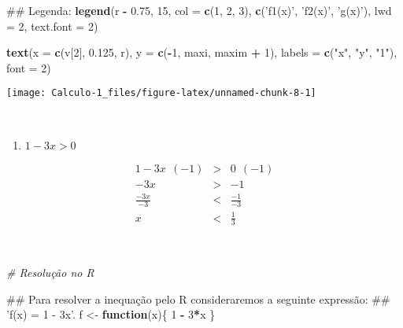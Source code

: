 \documentclass[]{book}
\newenvironment{Shaded}{\begin{snugshade}}{\end{snugshade}}
\newcommand{\KeywordTok}[1]{\textcolor[rgb]{0.13,0.29,0.53}{\textbf{#1}}}
\newcommand{\DataTypeTok}[1]{\textcolor[rgb]{0.13,0.29,0.53}{#1}}
\newcommand{\DecValTok}[1]{\textcolor[rgb]{0.00,0.00,0.81}{#1}}
\newcommand{\FloatTok}[1]{\textcolor[rgb]{0.00,0.00,0.81}{#1}}
\newcommand{\StringTok}[1]{\textcolor[rgb]{0.31,0.60,0.02}{#1}}
\newcommand{\CommentTok}[1]{\textcolor[rgb]{0.56,0.35,0.01}{\textit{#1}}}
\newcommand{\ControlFlowTok}[1]{\textcolor[rgb]{0.13,0.29,0.53}{\textbf{#1}}}
\newcommand{\OperatorTok}[1]{\textcolor[rgb]{0.81,0.36,0.00}{\textbf{#1}}}
\newcommand{\NormalTok}[1]{#1}
\providecommand{\tightlist}{%
  \setlength{\itemsep}{0pt}\setlength{\parskip}{0pt}}
\begin{document}
\begin{enumerate}
\begin{Shaded}
\begin{Highlighting}[]
\NormalTok{##  Legenda:}
\KeywordTok{legend}\NormalTok{(r }\OperatorTok{-}\StringTok{ }\FloatTok{0.75}\NormalTok{, }\DecValTok{15}\NormalTok{, }\DataTypeTok{col =} \KeywordTok{c}\NormalTok{(}\DecValTok{1}\NormalTok{, }\DecValTok{2}\NormalTok{, }\DecValTok{3}\NormalTok{), }\KeywordTok{c}\NormalTok{(}\StringTok{'f1(x)'}\NormalTok{, }\StringTok{'f2(x)'}\NormalTok{, }\StringTok{'g(x)'}\NormalTok{),}
   \DataTypeTok{lwd =} \DecValTok{2}\NormalTok{, }\DataTypeTok{text.font =} \DecValTok{2}\NormalTok{)}

\KeywordTok{text}\NormalTok{(}\DataTypeTok{x =} \KeywordTok{c}\NormalTok{(v[}\DecValTok{2}\NormalTok{], }\FloatTok{0.125}\NormalTok{, r), }\DataTypeTok{y =} \KeywordTok{c}\NormalTok{(}\OperatorTok{-}\DecValTok{1}\NormalTok{, maxi, maxim }\OperatorTok{+}\StringTok{ }\DecValTok{1}\NormalTok{),}
 \DataTypeTok{labels =} \KeywordTok{c}\NormalTok{(}\StringTok{"x"}\NormalTok{, }\StringTok{"y"}\NormalTok{, }\StringTok{"1"}\NormalTok{), }\DataTypeTok{font =} \DecValTok{2}\NormalTok{)  }
\end{Highlighting}
\end{Shaded}

  \begin{center}\texttt{[image: Calculo-1\_files/figure-latex/unnamed-chunk-8-1]} \end{center}

  ~

  \begin{enumerate}
  \def\labelenumii{\alph{enumii})}
  \setcounter{enumii}{4}
  \tightlist
  \item
    \(1-3x > 0\)
  \end{enumerate}

  \begin{eqnarray}
  1-3x \ \ (-1) &>& 0 \ \ (-1) \nonumber \\
  -3x &>& -1 \nonumber \\
  \frac{-3x}{-3} &<& \frac{-1}{-3} \nonumber \\
  x &<& \frac{1}{3} \nonumber
  \end{eqnarray}

  ~

\begin{Shaded}
\begin{Highlighting}[]
\CommentTok{# Resolução no R}

\NormalTok{##  Para resolver a inequação pelo R consideraremos a seguinte expressão:}
\NormalTok{## 'f(x) = 1 - 3x'.}
\NormalTok{f <-}\StringTok{ }\ControlFlowTok{function}\NormalTok{(x)\{}
  \DecValTok{1} \OperatorTok{-}\StringTok{ }\DecValTok{3}\OperatorTok{*}\NormalTok{x}
\NormalTok{\}}


\end{Highlighting}
\end{Shaded}
\end{enumerate}
\end{document}
